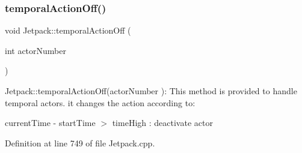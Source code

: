 \mbox{\label{class_jetpack_a2991b302cd99bf89325f9b66b104d575}} 
\subsubsection{\texorpdfstring{temporal\+Action\+Off()}{temporalActionOff()}}
{\footnotesize\ttfamily void Jetpack\+::temporal\+Action\+Off (\begin{DoxyParamCaption}\item[{int}]{actor\+Number }\end{DoxyParamCaption})}

Jetpack\+::temporal\+Action\+Off(actor\+Number )\+: This method is provided to handle temporal actors. it changes the action according to\+:

current\+Time -\/ start\+Time $>$ time\+High \+: deactivate actor 

Definition at line 749 of file Jetpack.\+cpp.


